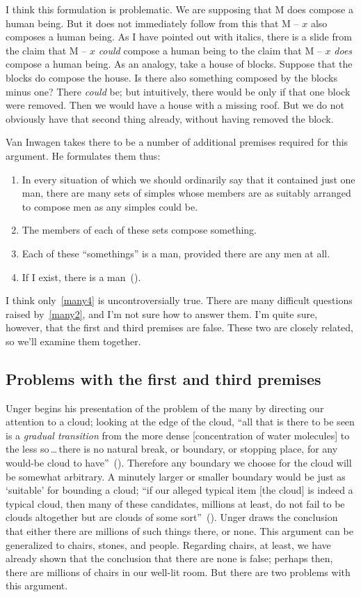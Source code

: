 \documentclass[11pt]{article}
\begin{document}
\begin{spacing}{1.5}
I think this formulation is problematic. We are supposing that M does compose a human being. But it does not immediately follow from this that M -- $x$ also composes a human being. As I have pointed out with italics, there is a slide from the claim that M -- $x$ {\em could} compose a human being to the claim that M -- $x$ {\em does} compose a human being. As an analogy, take a house of blocks. Suppose that the blocks do compose the house. Is there also something composed by the blocks minus one? There {\em could} be; but intuitively, there would be only if that one block were removed. Then we would have a house with a missing roof. But we do not obviously have that second thing already, without having removed the block.

Van Inwagen takes there to be a number of additional premises required for this argument. He formulates them thus:
\begin{enumerate}
	\item In every situation of which we should ordinarily say that it contained just one man, there are many sets of simples whose members are as suitably arranged to compose men as any simples could be. \label{many1}
	\item The members of each of these sets compose something. \label{many2}
	\item Each of these ``somethings'' is a man, provided there are any men at all. \label{many3}
	\item If I exist, there is a man~(\citeyear[216]{inwagen1995}). \label{many4}
\end{enumerate}
I think only~\ref{many4} is uncontroversially true. There are many difficult questions raised by~\ref{many2}, and I'm not sure how to answer them. I'm quite sure, however, that the first and third premises are false. These two are closely related, so we'll examine them together.

\subsection{Problems with the first and third premises}
\label{many13p}
Unger begins his presentation of the problem of the many by directing our attention to a cloud; looking at the edge of the cloud, ``all that is there to be seen is a {\em gradual transition} from the more dense [concentration of water molecules] to the less so\,\ldots\,there is no natural break, or boundary, or stopping place, for any would-be cloud to have''~(\citeyear[415]{unger1980a}). Therefore any boundary we choose for the cloud will be somewhat arbitrary. A minutely larger or smaller boundary would be just as `suitable' for bounding a cloud; ``if our alleged typical item [the cloud] is indeed a typical cloud, then many of these candidates, millions at least, do not fail to be clouds altogether but are clouds of some sort''~(\citeyear[421]{unger1980a}). Unger draws the conclusion that either there are millions of such things there, or none. This argument can be generalized to chairs, stones, and people. Regarding chairs, at least, we have already shown that the conclusion that there are none is false; perhaps then, there are millions of chairs in our well-lit room. But there are two problems with this argument.


\end{spacing}
\end{document}
